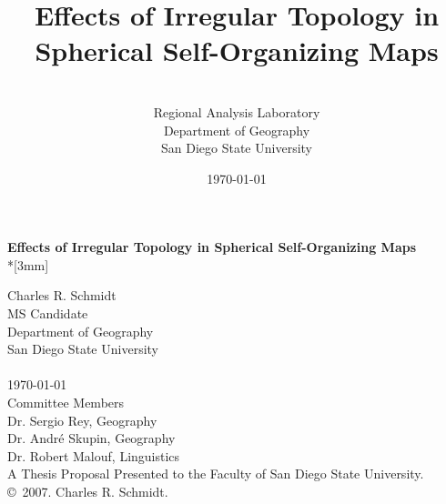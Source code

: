 \documentclass[10pt,titlepage]{article}
\title{Effects of Irregular Topology in Spherical Self-Organizing Maps}
\author{\sc{Charles R. Schmidt}\\Regional Analysis Laboratory\\Department of Geography\\San Diego State University}
\date{\today}
\begin{document}
\break
\begin{center}
{\Large{\bf Effects of Irregular Topology in Spherical Self-Organizing Maps}}\\*[3mm]
\end{center}
Charles R. Schmidt\\
MS Candidate\\
Department of Geography\\
San Diego State University\\\\
\today\\\break
Committee Members\\
Dr. Sergio Rey, Geography\\
Dr. Andr{\'e} Skupin, Geography\\
Dr. Robert Malouf, Linguistics\\\break
A Thesis Proposal Presented to the Faculty of San Diego State University.\\
\copyright~2007. Charles R. Schmidt. \\
%
\\
\tableofcontents
\newpage


%
\end{document}

